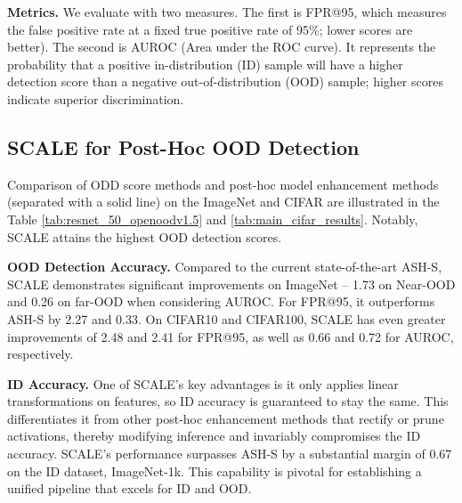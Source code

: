 \documentclass{article} %
\theoremstyle{plain}
\begin{document}
\textbf{Metrics.} We evaluate with two measures.  
The first is FPR@95, which measures the false positive rate at a fixed true positive rate of 95\%; lower scores are better).  The second is AUROC (Area under the ROC curve). It represents the probability that a positive in-distribution (ID) sample will have a higher detection score than a negative out-of-distribution (OOD) sample; higher scores indicate superior discrimination.

\subsection{SCALE for Post-Hoc OOD Detection}

Comparison of ODD score methods and post-hoc model enhancement methods (separated with a solid line) on the ImageNet and CIFAR are illustrated in the Table \ref{tab:resnet_50_openoodv1.5} and \ref{tab:main_cifar_results}. Notably, SCALE attains the highest OOD detection scores. 

\textbf{OOD Detection Accuracy.}
Compared to the current state-of-the-art ASH-S, SCALE demonstrates significant improvements on ImageNet -- 1.73 on Near-OOD and 0.26 on far-OOD when considering AUROC.  For FPR@95, it outperforms ASH-S by 2.27 and 0.33.
On CIFAR10 and CIFAR100, SCALE has even greater improvements of 2.48 and 2.41 for FPR@95, as well as 0.66 and 0.72 for AUROC, respectively.

\textbf{ID Accuracy.}
One of SCALE's key advantages is it only applies linear transformations on features, so ID accuracy is guaranteed to stay the same.  
This differentiates it from other post-hoc enhancement methods that rectify or prune activations, thereby modifying inference and invariably compromises the ID accuracy. 
SCALE's performance surpasses ASH-S by a substantial margin of 0.67 on the ID dataset, ImageNet-1k. This capability is pivotal for establishing a unified pipeline that excels for ID and OOD. 
\end{document}
